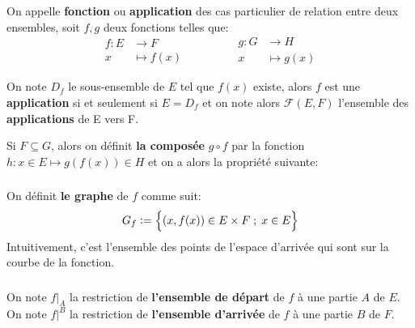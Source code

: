 \chapter*{}

On appelle \textbf{fonction} ou \textbf{application} des cas particulier de relation entre deux ensembles, soit \(f, g\) deux fonctions telles que:
\[
   \begin{aligned}
      f: E &\longrightarrow F\\
      x &\longmapsto f(x)
   \end{aligned}
      \hspace{50pt}
   \begin{aligned}
      g: G&\longrightarrow H\\
      x&\longmapsto g(x)
   \end{aligned}
\]

On note \(D_f\) le sous-ensemble de \(E\) tel que \(f(x)\) existe, alors \(f\) est une \textbf{application} si et seulement si \(E = D_f\) et on note alors \(\mathscr{F}(E, F)\) l'ensemble des \textbf{applications} de E vers F.\<

Si \(F \subseteq G\), alors on définit \textbf{la composée} \(g \circ f\) par la fonction \(h: x \in E \longmapsto g(f(x)) \in H\) et on a alors la propriété suivante:

\subsection*{}
On définit \textbf{le graphe} de \(f\) comme suit:
\[
   G_f:= \Bigl\{ (x, f(x)) \in E \times F \; ; \; x \in E\Bigl\}   
\]
Intuitivement, c'est l'ensemble des points de l'espace d'arrivée qui sont sur la courbe de la fonction.

\subsection*{}

On note \(f|_A\) la restriction de \textbf{l'ensemble de départ} de \(f\) à une partie \(A\) de \(E\).\+
On note \(f|^B\) la restriction de \textbf{l'ensemble d'arrivée} de \(f\) à une partie \(B\) de \(F\).\<

